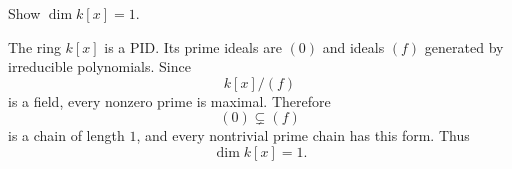 \begin{problem}\label{prob:vi29-05}
Show \(\dim k[x]=1\).

\end{problem}

\ifdefined\FullProblemDossiers
\begin{solution}
The ring \(k[x]\) is a PID.  Its prime ideals are \((0)\) and ideals \((f)\) generated by irreducible
polynomials.  Since
\[
k[x]/(f)
\]
is a field, every nonzero prime is maximal.  Therefore
\[
(0)\subsetneq(f)
\]
is a chain of length \(1\), and every nontrivial prime chain has this form.  Thus
\[
\boxed{\dim k[x]=1}.
\]
\end{solution}
\fi
